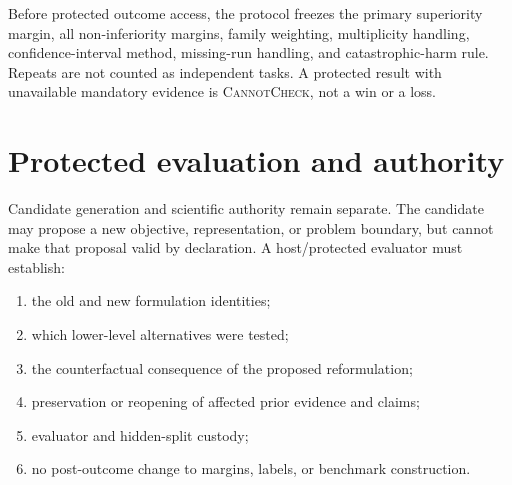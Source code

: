 \documentclass[11pt]{article}
\begin{document}
Before protected outcome access, the protocol freezes the primary superiority margin, all non-inferiority margins, family weighting, multiplicity handling, confidence-interval method, missing-run handling, and catastrophic-harm rule. Repeats are not counted as independent tasks. A protected result with unavailable mandatory evidence is \textsc{CannotCheck}, not a win or a loss.

\section{Protected evaluation and authority}
Candidate generation and scientific authority remain separate. The candidate may propose a new objective, representation, or problem boundary, but cannot make that proposal valid by declaration. A host/protected evaluator must establish:
\begin{enumerate}[leftmargin=*]
    \item the old and new formulation identities;
    \item which lower-level alternatives were tested;
    \item the counterfactual consequence of the proposed reformulation;
    \item preservation or reopening of affected prior evidence and claims;
    \item evaluator and hidden-split custody;
    \item no post-outcome change to margins, labels, or benchmark construction.
\end{enumerate}
\end{document}
